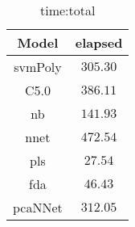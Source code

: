 \begin{table}[!ht]
	\centering
	\begin{tabular}{|c|c|}
		\hline
		Model & elapsed \\ \hline
		svmPoly & $305.30$ \\ \hline
		C5.0 & $386.11$ \\ \hline
		nb & $141.93$ \\ \hline
		nnet & $472.54$ \\ \hline
		pls & $27.54$ \\ \hline
		fda & $46.43$ \\ \hline
		pcaNNet & $312.05$ \\ \hline
	\end{tabular}
	\caption{time:total}
	\label{tab:time:total}
\end{table}
